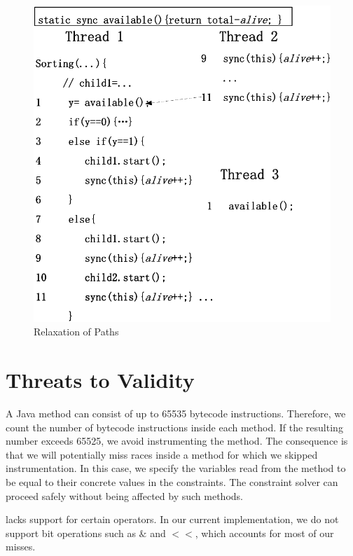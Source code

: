  


\begin{figure}[htp]
\centering
\includegraphics[scale=0.45]{figs/Visio-msort.pdf}
\caption{Relaxation of Paths}\label{fig:relax2}
\end{figure}


\section{Threats to Validity}
A Java method can consist of up to 65535 bytecode instructions. Therefore,
 we count the number of bytecode instructions inside each method. If the 
resulting number exceeds 65525, we avoid instrumenting the method. 
The consequence is that we will potentially miss races inside a method for 
which we skipped instrumentation. In this case, we specify the variables 
read from the method to be equal to their concrete values in the constraints. 
The constraint solver can proceed safely without being affected by 
such methods.

\tool lacks support for certain operators. In our current 
implementation, we do not support bit operations such as $\&$ and $<<$, which accounts for most of our misses.




